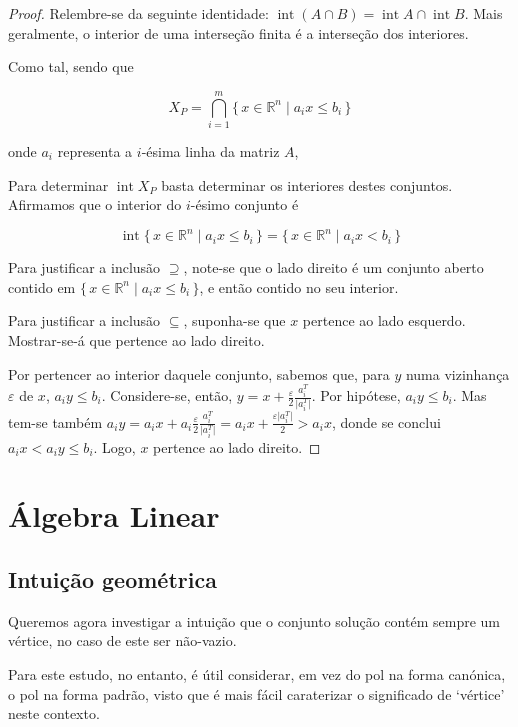 \documentclass{article}
\DeclareMathOperator{\interior}{int}
\newcommand{\R}{\mathbb{R}}
\theoremstyle{definition}
\begin{document}
	\begin{proof}
	Relembre-se da seguinte identidade: $\interior (A \cap B) = \interior A \cap \interior B$. Mais geralmente, o interior de uma interseção finita é a interseção dos interiores.
	
	Como tal, sendo que
	
	\[X_P = \bigcap_{i=1}^m \{\,x \in \R^n \mid a_i x \leq b_i \,\}\]
	
	onde $a_i$ representa a $i$-ésima linha da matriz $A$,
	
	Para determinar $\interior X_P$ basta determinar os interiores destes conjuntos. Afirmamos que o interior do $i$-ésimo conjunto é
	
	\[\interior \{\,x \in \R^n \mid a_i x \leq b_i \,\} = \{\,x \in \R^n \mid a_i x < b_i \,\}\]
	
	Para justificar a inclusão $\supseteq$, note-se que o lado direito é um conjunto aberto contido em $\{\,x \in \R^n \mid a_i x \leq b_i \,\}$, e então contido no seu interior.
	
	Para justificar a inclusão $\subseteq$, suponha-se que $x$ pertence ao lado esquerdo. Mostrar-se-á que pertence ao lado direito.
	
	Por pertencer ao interior daquele conjunto, sabemos que, para $y$ numa vizinhança $\varepsilon$ de $x$, $a_i y \leq b_i$. Considere-se, então, $y = x + \frac \varepsilon 2 \frac{a_i^T}{\lvert a_i^T \rvert}$. Por hipótese, $a_i y \leq b_i$. Mas tem-se também $a_i y = a_i x + a_i \frac \varepsilon 2 \frac{a_i^T}{\lvert a_i^T \rvert} = a_i x + \frac {\varepsilon \lvert a_i^T \rvert} 2 > a_i x$, donde se conclui $a_i x < a_i y \leq b_i$. Logo, $x$ pertence ao lado direito.
	\end{proof}
	
	\section{Álgebra Linear}
	
	\subsection{Intuição geométrica}
	
	Queremos agora investigar a intuição que o conjunto solução contém sempre um vértice, no caso de este ser não-vazio.
	
	Para este estudo, no entanto, é útil considerar, em vez do pol na forma canónica, o pol na forma padrão, visto que é mais fácil caraterizar o significado de `vértice' neste contexto.
	
\end{document}

